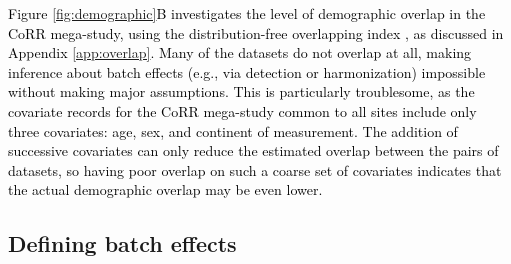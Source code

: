 \textcolor{black}{Figure \ref{fig:demographic}B investigates the level of demographic overlap in the CoRR mega-study, using the distribution-free overlapping index \cite{Pastore2019}, as discussed in Appendix \ref{app:overlap}. Many of the datasets do not overlap at all, making inference about batch effects (e.g., via detection or harmonization) impossible without making major assumptions. This is particularly troublesome, as the covariate records for the CoRR mega-study common to all sites include only three covariates: age, sex, and continent of measurement. The addition of successive covariates can only reduce the estimated overlap between the pairs of datasets, so having poor overlap on such a coarse set of covariates indicates that the actual demographic overlap may be even lower.}

\subsection{Defining batch effects}


